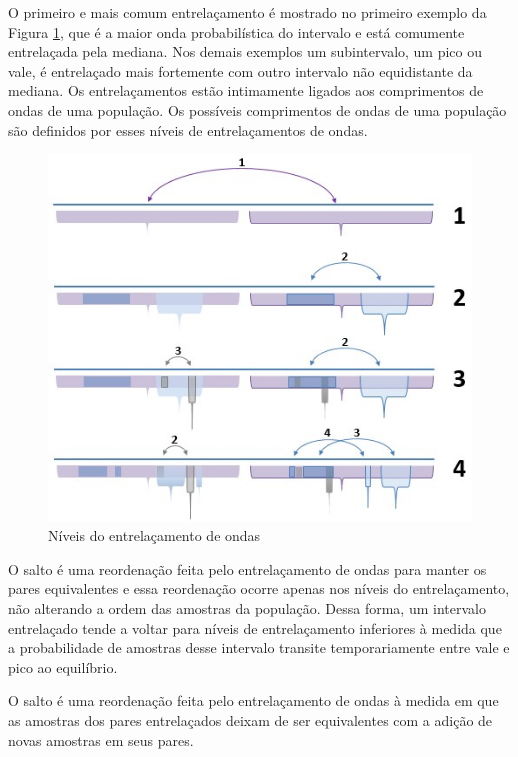 O primeiro e mais comum entrelaçamento é mostrado no primeiro exemplo da Figura \ref{fig:consciousness_subconscious_entanglement}, que é a maior onda probabilística do intervalo e está comumente entrelaçada pela mediana. Nos demais exemplos um subintervalo, um pico ou vale, é entrelaçado mais fortemente com outro intervalo não equidistante da mediana. Os entrelaçamentos estão intimamente ligados aos comprimentos de ondas de uma população. Os possíveis comprimentos de ondas de uma população são definidos por esses níveis de entrelaçamentos de ondas.
	\begin{figure}[H]
	\caption{Níveis do entrelaçamento de ondas}
	\label{fig:consciousness_subconscious_entanglement}
	\centering
	\includegraphics[scale=.8]{sections/images/consciousness_subconscious_entanglement.jpg}
	\end{figure}

O salto é uma reordenação feita pelo entrelaçamento de ondas para manter os pares equivalentes e essa reordenação ocorre apenas nos níveis do entrelaçamento, não alterando a ordem das amostras da população. Dessa forma, um intervalo entrelaçado tende a voltar para níveis de entrelaçamento inferiores à medida que a probabilidade de amostras desse intervalo transite temporariamente entre vale e pico ao equilíbrio. 

O salto é uma reordenação feita pelo entrelaçamento de ondas à medida em que as amostras dos pares entrelaçados deixam de ser equivalentes com a adição de novas amostras em seus pares.

